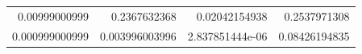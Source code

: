 \begin{tabular}{rrrr}
0.00999000999 & 0.2367632368 & 0.02042154938 & 0.2537971308 \\
0.000999000999 & 0.003996003996 & 2.837851444e-06 & 0.08426194835 \\
\end{tabular}
